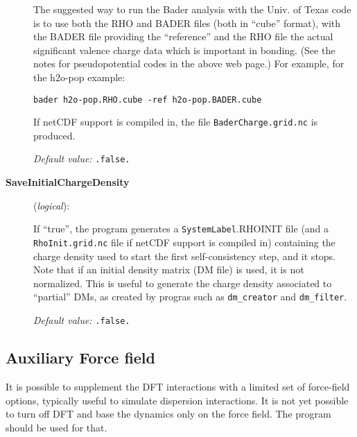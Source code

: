 \begin{description}
  The suggested way to run the Bader analysis with the Univ. of Texas
  code is to use both the RHO and BADER files (both in ``cube''
  format), with the BADER file providing the ``reference'' and the RHO
  file the actual significant valence charge data which is important
  in bonding. (See the notes for pseudopotential codes in the above
  web page.) For example, for the h2o-pop example:

  \texttt{bader  h2o-pop.RHO.cube -ref h2o-pop.BADER.cube}


If netCDF support is compiled in, the file \texttt{BaderCharge.grid.nc}
is produced.

\textit{Default value:} \texttt{.false.}



\item[\textbf{SaveInitialChargeDensity}] (\textit{logical}):

  If ``true'', the program generates a \texttt{SystemLabel}.RHOINIT file
  (and a \texttt{RhoInit.grid.nc} file if netCDF support is compiled in)
  containing the charge density used to start the first
  self-consistency step, and it stops. Note that if an initial density
  matrix (DM file) is used, it is not normalized. This is useful to
  generate the charge density associated to ``partial'' DMs, as
  created by progras such as \texttt{dm\_creator} and \texttt{dm\_filter}.

\textit{Default value:} \texttt{.false.}


\end{description}

\vspace{5pt}
\subsection{Auxiliary Force field}

It is possible to supplement the DFT interactions with a limited
set of force-field options, typically useful to simulate dispersion
interactions. It is not yet possible to turn off DFT and base the
dynamics only on the force field. The  program should be
used for that.


